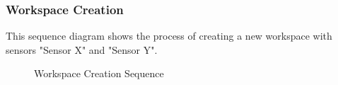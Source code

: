 \subsubsection{Workspace Creation}
This sequence diagram shows the process of creating a new workspace with sensors "Sensor X" and "Sensor Y".
\begin{figure}[!htb]
    \centering
    \caption{Workspace Creation Sequence}
    \label{fig:seq-desktop-workspace-create}
\end{figure}

